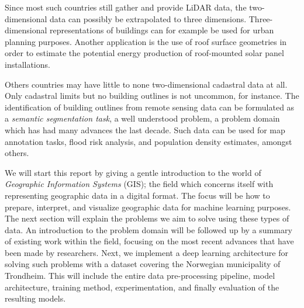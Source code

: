 Since most such countries still gather and provide LiDAR data, the two-dimensional data can possibly be extrapolated to three dimensions.
Three-dimensional representations of buildings can for example be used for urban planning purposes.
Another application is the use of roof surface geometries in order to estimate the potential energy production of roof-mounted solar panel installations.

Others countries may have little to none two-dimensional cadastral data at all.
Only cadastral limits but no building outlines is not uncommon, for instance.
The identification of building outlines from remote sensing data can be formulated as a \textit{semantic segmentation task}, a well understood problem, a problem domain which has had many advances the last decade.
Such data can be used for map annotation tasks, flood risk analysis, and population density estimates, amongst others.

We will start this report by giving a gentle introduction to the world of \textit{Geographic Information Systems} (GIS); the field which concerns itself with representing geographic data in a digital format.
The focus will be how to prepare, interpret, and visualize geographic data for machine learning purposes.
The next section will explain the problems we aim to solve using these types of data.
An introduction to the problem domain will be followed up by a summary of existing work within the field, focusing on the most recent advances that have been made by researchers.
Next, we implement a deep learning architecture for solving such problems with a dataset covering the Norwegian municipality of Trondheim.
This will include the entire data pre-processing pipeline, model architecture, training method, experimentation, and finally evaluation of the resulting models.
